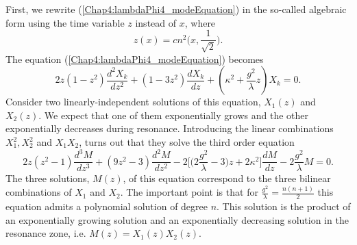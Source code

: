 \documentclass[11pt,a4paper,twoside]{book}
\begin{document}
First, we rewrite (\ref{Chap4:lambdaPhi4_modeEquation}) in the so-called algebraic form using the time variable $ z $ instead of $ x $, where
\begin{equation}
	\label{Chap4:lambdaPhi4}
	z(x)=cn^{2}\Bigg(x,\frac{1}{\sqrt{2}}\Bigg).
\end{equation}
The equation (\ref{Chap4:lambdaPhi4_modeEquation}) becomes
\begin{equation}
\label{Chap4:lambdaPhi4_fluctuations}
2z(1-z^{2})\frac{d^{2}X_{k}}{dz^{2}} + (1-3z^{2})\frac{dX_{k}}{dz} + (\kappa^{2} + \frac{g^{2}}{\lambda}z)X_{k}=0.
\end{equation}
Consider two linearly-independent solutions of this equation, $ X_{1}(z) $ and $ X_{2}(z) $. We expect that one of them exponentially grows and the other exponentially decreases during resonance. Introducing the linear combinations $ X_{1}^{2}, X_{2}^{2} $ and $ X_{1}X_{2} $,  turns out that they solve the third order equation 
\begin{equation}
\label{Chap4:lambdaPhi4_equationForMz}
2z(z^{2}-1)\frac{d^{3}M}{dz^{3}} + (9z^{2}-3)\frac{d^{2}M}{dz^{2}} -2\Bigg[\bigg(2\frac{g^{2}}{\lambda} - 3\bigg)z + 2\kappa^{2}\Bigg]\frac{dM}{dz} - 2\frac{g^{2}}{\lambda}M = 0.
\end{equation}
The three solutions, $ M(z) $, of this equation correspond to the three bilinear combinations of $ X_{1} $ and $ X_{2} $. The important point is that for $ \frac{g^{2}}{\lambda} = \frac{n(n+1)}{2} $ this equation admits a polynomial solution of degree $ n $. This solution is the product of an exponentially growing solution and an exponentially decreasing solution in the resonance zone, i.e. $ M(z)=X_{1}(z)X_{2}(z) $.
\end{document}
